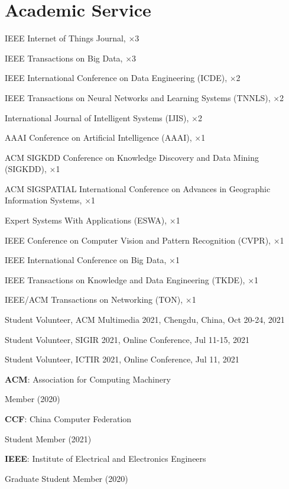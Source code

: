 \section*{Academic Service}


\indent

IEEE Internet of Things Journal, $\times$3

IEEE Transactions on Big Data, $\times$3

IEEE International Conference on Data Engineering (ICDE), $\times$2

IEEE Transactions on Neural Networks and Learning Systems (TNNLS), $\times$2

International Journal of Intelligent Systems (IJIS), $\times$2

AAAI Conference on Artificial Intelligence (AAAI), $\times$1

ACM SIGKDD Conference on Knowledge Discovery and Data Mining (SIGKDD), $\times$1

ACM SIGSPATIAL International Conference on Advances in Geographic Information Systems, $\times$1

Expert Systems With Applications (ESWA), $\times$1

IEEE Conference on Computer Vision and Pattern Recognition (CVPR), $\times$1

IEEE International Conference on Big Data, $\times$1

IEEE Transactions on Knowledge and Data Engineering (TKDE), $\times$1

IEEE/ACM Transactions on Networking (TON), $\times$1

\indent 

Student Volunteer, ACM Multimedia 2021, Chengdu, China, Oct 20-24, 2021

Student Volunteer, SIGIR 2021, Online Conference, Jul 11-15, 2021

Student Volunteer, ICTIR 2021, Online Conference, Jul 11, 2021

\indent 

\textbf{ACM}: Association for Computing Machinery 

\hspace{2em}Member (2020)

\textbf{CCF}: China Computer Federation

\hspace{2em}Student Member (2021)

\textbf{IEEE}: Institute of Electrical and Electronics Engineers

\hspace{2em}Graduate Student Member (2020)
